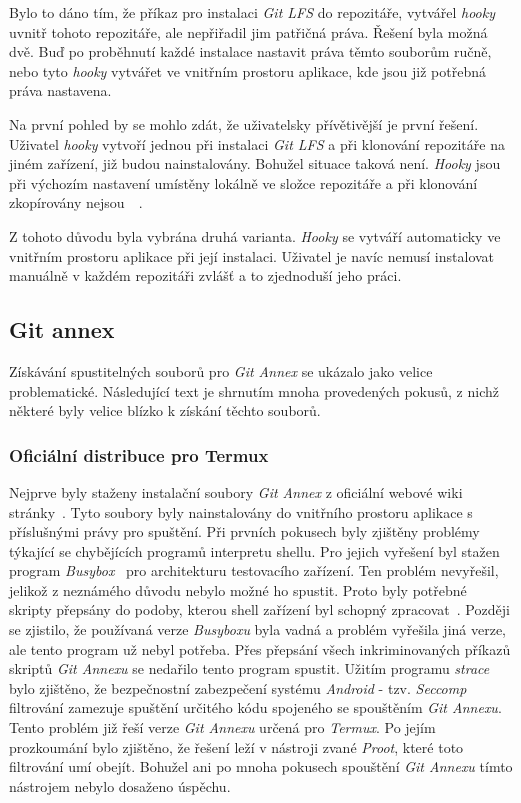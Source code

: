     Bylo to dáno tím, že příkaz pro instalaci \emph{Git LFS} do repozitáře, vytvářel \emph{hooky} uvnitř tohoto repozitáře, ale nepřiřadil jim patřičná práva. Řešení byla možná dvě. Buď po proběhnutí každé instalace nastavit práva těmto souborům ručně, nebo tyto \emph{hooky} vytvářet ve vnitřním prostoru aplikace, kde jsou již potřebná práva nastavena.
    
    Na první pohled by se mohlo zdát, že uživatelsky přívětivější je první řešení. Uživatel \emph{hooky} vytvoří jednou při instalaci \emph{Git LFS} a při klonování repozitáře na jiném zařízení, již budou nainstalovány. Bohužel situace taková není. \emph{Hooky} jsou při výchozím nastavení umístěny lokálně ve složce  repozitáře a při klonování zkopírovány nejsou~~.

    Z tohoto důvodu byla vybrána druhá varianta. \emph{Hooky} se vytváří automaticky ve vnitřním prostoru aplikace při její instalaci. Uživatel je navíc nemusí instalovat manuálně v každém repozitáři zvlášť a to zjednoduší jeho práci.

    \newpage
    \subsection{Git annex}\label{sec:problemy_annex}
    Získávání spustitelných souborů pro \emph{Git Annex} se ukázalo jako velice problematické. Následující text je shrnutím mnoha provedených pokusů, z nichž některé byly velice blízko k získání těchto souborů.

    \subsubsection{Oficiální distribuce pro Termux}
    Nejprve byly staženy instalační soubory \emph{Git Annex} z oficiální webové wiki stránky~. Tyto soubory byly nainstalovány do vnitřního prostoru aplikace s příslušnými právy pro spuštění. Při prvních pokusech byly zjištěny problémy týkající se chybějících programů interpretu shellu. Pro jejich vyřešení byl stažen program \emph{Busybox}~ pro architekturu testovacího zařízení. Ten problém nevyřešil, jelikož z neznámého důvodu nebylo možné ho spustit. Proto byly potřebné skripty přepsány do podoby, kterou shell zařízení byl schopný zpracovat~\label{annex_skripts_overwrite}. Později se zjistilo, že používaná verze \emph{Busyboxu} byla vadná a problém vyřešila jiná verze, ale tento program už nebyl potřeba. Přes přepsání všech inkriminovaných příkazů skriptů \emph{Git Annexu} se nedařilo tento program spustit. Užitím programu \emph{strace} bylo zjištěno, že bezpečnostní zabezpečení systému \emph{Android} - tzv. \emph{Seccomp} filtrování zamezuje spuštění určitého kódu spojeného se spouštěním \emph{Git Annexu}. Tento problém již řeší verze \emph{Git Annexu} určená pro \emph{Termux}. Po jejím prozkoumání bylo zjištěno, že řešení leží v nástroji zvané \emph{Proot}, které toto filtrování umí obejít. Bohužel ani po mnoha pokusech spouštění \emph{Git Annexu} tímto nástrojem nebylo dosaženo úspěchu.

